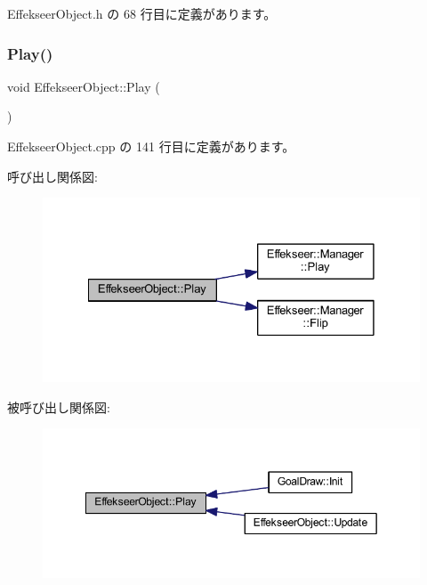  Effekseer\+Object.\+h の 68 行目に定義があります。

\mbox{\label{class_effekseer_object_a59c8a12b4eb558449622660d892b3cf4}} 
\subsubsection{\texorpdfstring{Play()}{Play()}}
{\footnotesize\ttfamily void Effekseer\+Object\+::\+Play (\begin{DoxyParamCaption}{ }\end{DoxyParamCaption})}



 Effekseer\+Object.\+cpp の 141 行目に定義があります。

呼び出し関係図\+:\nopagebreak
\begin{figure}[H]
\begin{center}
\leavevmode
\includegraphics[width=328pt]{class_effekseer_object_a59c8a12b4eb558449622660d892b3cf4_cgraph}
\end{center}
\end{figure}
被呼び出し関係図\+:\nopagebreak
\begin{figure}[H]
\begin{center}
\leavevmode
\includegraphics[width=349pt]{class_effekseer_object_a59c8a12b4eb558449622660d892b3cf4_icgraph}
\end{center}
\end{figure}
\mbox{\label{class_effekseer_object_a5c496e56785ef7b784b13642d59d4e7f}} 

